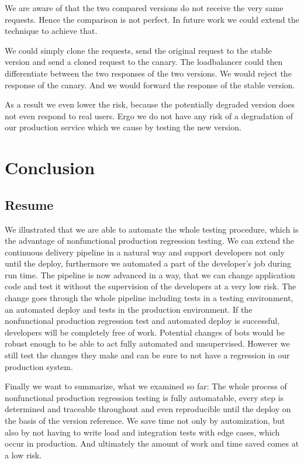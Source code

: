 We are aware of that the two compared versions do not receive the very same
requests. Hence the comparison is not perfect. In future work we could extend the
technique to achieve that.

We could simply clone the requests, send the original request to the stable version and
send a cloned request to the canary. The loadbalancer could then differentiate between the
two responses of the two versions. We would reject the response of the canary. And we
would forward the response of the stable version.

As a result we even lower the risk, because the potentially degraded version does not even
respond to real users. Ergo we do not have any risk of a degradation of our production
service which we cause by testing the new version.

\chapter{Conclusion}
\section{Resume}

We illustrated that we are able to automate the whole testing procedure, which is the
advantage of nonfunctional production regression testing. We can extend the continuous
delivery pipeline in a natural way and support developers not only until the deploy,
furthermore we automated a part of the developer's job during run time. The pipeline is
now advanced in a way, that we can change application code and test it without the
supervision of the developers at a very low risk. The change goes through the whole
pipeline including tests in a testing environment, an automated deploy and tests in the
production environment. If the nonfunctional production regression test and automated
deploy is successful, developers will be completely free of work. Potential changes of
bots would be robust enough to be able to act fully automated and unsupervised. However we
still test the changes they make and can be sure to not have a regression in our
production system.

Finally we want to summarize, what we examined so far: The whole process of nonfunctional
production regression testing is fully automatable, every step is determined and traceable
throughout and even reproducible until the deploy on the basis of the version
reference. We save time not only by automization, but also by not having to write load and
integration tests with edge cases, which occur in production. And ultimately the amount of
work and time saved comes at a low risk.



